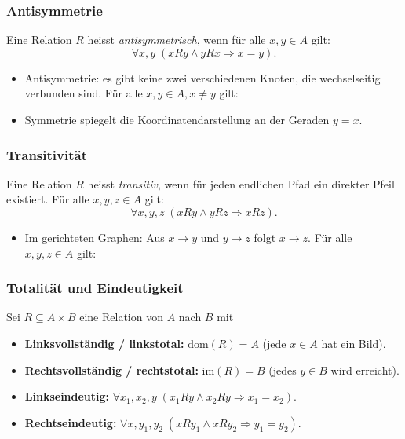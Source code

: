 \subsubsection{Antisymmetrie}
Eine Relation \(R\) heisst \emph{antisymmetrisch}, wenn für
alle \(x,y\in A\) gilt:
\[
    \forall x,y\;(xRy\land yRx\Rightarrow x=y).
\]
\begin{itemize}
  \item Antisymmetrie: es gibt keine zwei verschiedenen Knoten, die wechselseitig verbunden sind.
    Für alle \(x,y\in A, x\neq y\) gilt:\\
  \item Symmetrie spiegelt die Koordinatendarstellung an der Geraden \(y=x\).
\end{itemize}

\subsubsection{Transitivität}
Eine Relation \(R\) heisst \emph{transitiv}, wenn für jeden endlichen Pfad ein direkter Pfeil existiert. Für alle \(x,y,z\in A\) gilt:
\[
  \forall x,y,z\;(xRy\land yRz\Rightarrow xRz).
\]
\begin{itemize}
    \item Im gerichteten Graphen: Aus \(x\to y\) und \(y\to z\) folgt \(x\to z\). Für alle \(x,y,z\in A\) gilt:\\
\end{itemize}

\subsubsection{Totalität und Eindeutigkeit}
Sei \(R\subseteq A\times B\) eine Relation von \(A\) nach \(B\) mit
\begin{itemize}
  \item \textbf{Linksvollständig / linkstotal:} \(\mathrm{dom}(R)=A\) (jede \(x\in A\) hat ein Bild).
  \item \textbf{Rechtsvollständig / rechtstotal:} \(\mathrm{im}(R)=B\) (jedes \(y\in B\) wird erreicht).
  \item \textbf{Linkseindeutig:} \(\forall x_1,x_2,y\;(x_1Ry\land x_2Ry\Rightarrow x_1=x_2)\).
  \item \textbf{Rechtseindeutig:} \(\forall x,y_1,y_2\;(xRy_1\land xRy_2\Rightarrow y_1=y_2)\).
\end{itemize}
